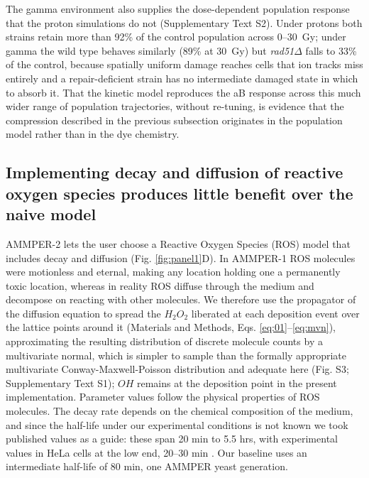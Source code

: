 \documentclass{asmarticle}
\begin{document}
The gamma environment also supplies the dose-dependent population response that the proton simulations do not (Supplementary Text S2). Under protons both strains retain more than 92\% of the control population across 0--30~Gy; under gamma the wild type behaves similarly (89\% at 30~Gy) but \textit{rad51}$\Delta$ falls to 33\% of the control, because spatially uniform damage reaches cells that ion tracks miss entirely and a repair-deficient strain has no intermediate damaged state in which to absorb it. That the kinetic model reproduces the aB response across this much wider range of population trajectories, without re-tuning, is evidence that the compression described in the previous subsection originates in the population model rather than in the dye chemistry.

\subsection{Implementing decay and diffusion of reactive oxygen species produces little benefit over the naive model}

AMMPER-2 lets the user choose a Reactive Oxygen Species (ROS) model that includes decay and diffusion (Fig. \ref{fig:panel1}D). In AMMPER-1 ROS molecules were motionless and eternal, making any location holding one a permanently toxic location, whereas in reality ROS diffuse through the medium and decompose on reacting with other molecules. We therefore use the propagator of the diffusion equation to spread the $H_2O_2$ liberated at each deposition event over the lattice points around it (Materials and Methods, Eqs. \ref{eq:01}--\ref{eq:mvn}), approximating the resulting distribution of discrete molecule counts by a multivariate normal, which is simpler to sample than the formally appropriate multivariate Conway-Maxwell-Poisson distribution and adequate here (Fig. S3; Supplementary Text S1); $OH$ remains at the deposition point in the present implementation. Parameter values follow the physical properties of ROS molecules. The decay rate depends on the chemical composition of the medium, and since the half-life under our experimental conditions is not known we took published values as a guide: these span 20 min to 5.5 hrs, with experimental values in HeLa cells at the low end, 20--30 min \cite{krumova2016overview, hernansanz2021generation, farahani2022oxidative, juan2021chemistry}. Our baseline uses an intermediate half-life of 80 min, one AMMPER yeast generation.
\end{document}
